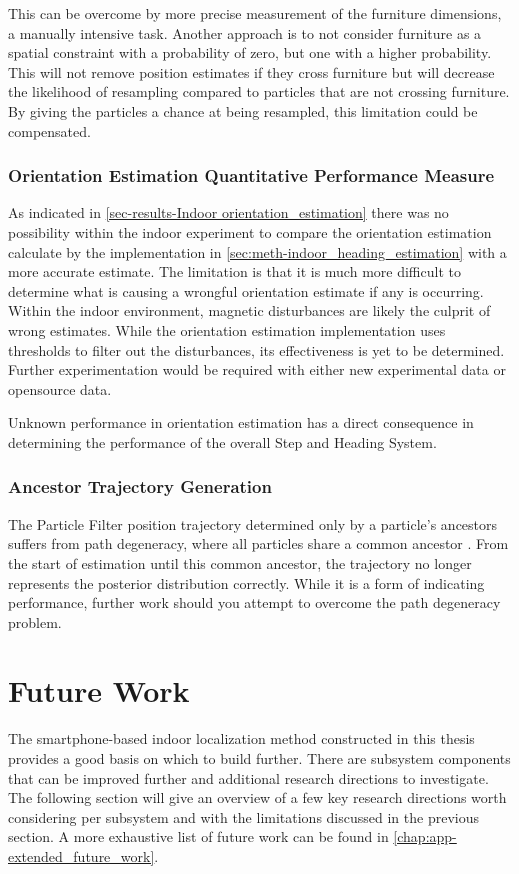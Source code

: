 This can be overcome by more precise measurement of the furniture dimensions, a manually intensive task. Another approach is to not consider furniture as a spatial constraint with a probability of zero, but one with a higher probability. This will not remove position estimates if they cross furniture but will decrease the likelihood of resampling compared to particles that are not crossing furniture. By giving the particles a chance at being resampled, this limitation could be compensated.

\subsubsection{ Orientation Estimation Quantitative Performance Measure}

As indicated in \cref{sec-results-Indoor orientation_estimation} there was no possibility within the indoor experiment to compare the orientation estimation calculate by the implementation in \cref{sec:meth-indoor_heading_estimation} with a more accurate estimate. The limitation is that it is much more difficult to determine what is causing a wrongful orientation estimate if any is occurring. 
Within the indoor environment, magnetic disturbances are likely the culprit of wrong estimates. While the orientation estimation implementation uses thresholds to filter out the disturbances, its effectiveness is yet to be determined. Further experimentation would be required with either new experimental data or opensource data.

Unknown performance in orientation estimation has a direct consequence in determining the performance of the overall Step and Heading System. 

\subsubsection{Ancestor Trajectory Generation}
The Particle Filter position trajectory determined only by a particle's ancestors suffers from path degeneracy, where all particles share a common ancestor \cite{Lindsten2013}. From the start of estimation until this common ancestor, the trajectory no longer represents the posterior distribution correctly. While it is a form of indicating performance, further work should you attempt to overcome the path degeneracy problem.

\section{Future Work}
\label{sec:conclusion-future_work}
The smartphone-based indoor localization method constructed in this thesis provides a good basis on which to build further. There are subsystem components that can be improved further and additional research directions to investigate. The following section will give an overview of a few key research directions worth considering per subsystem and with the limitations discussed in the previous section. A more exhaustive list of future work can be found in \cref{chap:app-extended_future_work}. 

